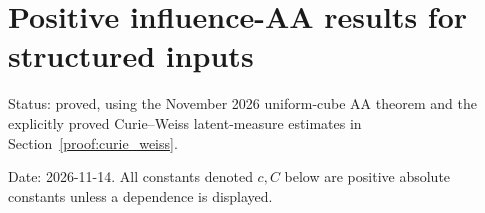\begingroup
\setlength{\parskip}{3pt plus 0.5pt}
\renewcommand{\tightlist}{\setlength{\itemsep}{1pt}\setlength{\parskip}{0pt}}
\section{Positive influence-AA results for structured inputs}\label{ht:positive-aa-results-for-structured-inputs}\label{proof:high_temperature}

Status: proved, using the November 2026 uniform-cube AA theorem and the explicitly proved Curie--Weiss latent-measure estimates in Section~\ref{proof:curie_weiss}.

Date: 2026-11-14. All constants denoted \(c,C\) below are positive absolute constants unless a dependence is displayed.








